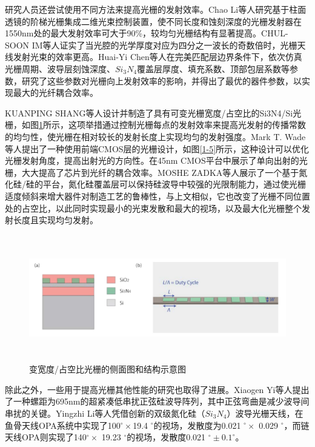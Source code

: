 \documentclass[UTF8,a4paper,12pt]{ctexart}
\numberwithin{equation}{section}
\begin{document}
研究人员还尝试使用不同方法来提高光栅的发射效率。Chao Li等人研究基于柱面透镜的阶梯光栅集成二维光束控制装置，使不同长度和蚀刻深度的光栅发射器在1550nm处的最大发射效率可大于90\%，较均匀光栅结构有显著提高。CHUL-SOON IM等人证实了当光腔的光学厚度对应为四分之一波长的奇数倍时，光栅天线发射光束的效率更高。Huai-Yi Chen等人在完美匹配层边界条件下，依次仿真光栅周期、波导层刻蚀深度、$Si_3N_4$覆盖层厚度、填充系数、顶部包层系数等参数，研究了这些参数对光栅向上发射效率的影响，并得出了最优的器件参数，以实现最大的光纤耦合效率。



KUANPING SHANG等人设计并制造了具有可变光栅宽度/占空比的Si3N4/Si光栅，如图\ref{1-4}所示，这项举措通过控制光栅每点的发射效率来提高光发射的传播常数的均匀性，使光栅在相对较长的发射长度上实现均匀的发射强度。Mark T. Wade等人提出了一种使用前端CMOS层的光栅设计，如图\ref{1-5}所示，这种设计可以优化光栅发射角度，提高出射光的方向性。在45nm CMOS平台中展示了单向出射的光栅，大大提高了芯片到光纤的耦合效率。MOSHE ZADKA等人展示了一个基于氮化硅/硅的平台，氮化硅覆盖层可以保持硅波导中较强的光限制能力，通过使光栅适度倾斜来增大器件对制造工艺的鲁棒性，与上文相似，它也改变了光栅不同位置处的占空比，以此同时实现最小的光束发散和最大的视场，以及最大化光栅整个发射长度且实现均匀发射。

\begin{figure}[htbp]
\centering %
\includegraphics[height=5.5cm,width=16cm]{fig12.png}
\caption{变宽度/占空比光栅的侧面图和结构示意图}
\label{1-4}
\end{figure}

除此之外，一些用于提高光栅其他性能的研究也取得了进展。Xiaogen Yi等人提出了一种螺距为695nm的超紧凑低串扰正弦硅波导阵列，其中正弦弯曲是减少波导间串扰的关键。Yingzhi Li等人凭借创新的双级氮化硅（$Si_3N_4$）波导光栅天线，在鱼骨天线OPA系统中实现了100$^\circ \times$19.4 $^\circ$的视场，发散度为0.021 $^\circ\times$ 0.029 $^\circ$，而链天线OPA则实现了140$^\circ\times$ 19.23 $^\circ$的视场，发散度0.021 $^\circ \pm0.1^\circ$。
\end{document}
